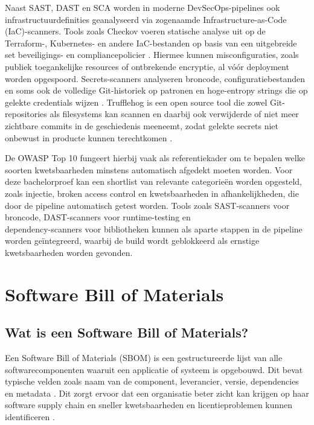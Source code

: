 Naast SAST, DAST en SCA worden in moderne DevSecOps-pipelines ook infrastructuurdefinities geanalyseerd via zogenaamde Infrastructure-as-Code (IaC)-scanners. Tools zoals Checkov voeren statische analyse uit op de Terraform-, Kubernetes- en andere IaC-bestanden op basis van een uitgebreide set beveiligings- en compliancepolicier \autocite{CheckovDoc,CheckovGithub}. Hiermee kunnen misconfiguraties, zoals publiek toegankelijke resources of ontbrekende encryptie, al vóór deployment worden opgespoord. Secrets-scanners analyseren broncode, configuratiebestanden en soms ook de volledige Git-historiek op patronen en hoge-entropy strings die op gelekte credentials wijzen \autocite{TrufflehogDeepDive}. Trufflehog is een open source tool die zowel Git-repositories als filesystems kan scannen en daarbij ook verwijderde of niet meer zichtbare commits in de geschiedenis meeneemt, zodat gelekte secrets niet onbewust in producte kunnen terechtkomen \autocite{TrufflehogGithub,TrufflehogBlogGitVsFs,TrufflehogBlogDeletedCommits}.

De OWASP Top 10 \autocite{OWASPTop10_2025} fungeert hierbij vaak als referentiekader om te bepalen welke soorten kwetsbaarheden minstens automatisch afgedekt moeten worden. Voor deze bachelorproef kan een shortlist van relevante categorieën worden opgesteld, zoals injectie, broken access control en kwetsbaarheden in afhankelijkheden, die door de pipeline automatisch getest worden. Tools zoals SAST-scanners voor broncode, DAST-scanners voor runtime-testing en\\dependency-scanners voor bibliotheken kunnen als aparte stappen in de pipeline worden geïntegreerd, waarbij de build wordt geblokkeerd als ernstige kwetsbaarheden worden gevonden.

\section{Software Bill of Materials}
\subsection{Wat is een Software Bill of Materials?}

Een Software Bill of Materials (SBOM) is een gestructureerde lijst van alle softwarecomponenten waaruit een applicatie of systeem is opgebouwd. Dit bevat typische velden zoals naam van de component, leverancier, versie, dependencies en metadata \autocite{IEEE2025}. Dit zorgt ervoor dat een organisatie beter zicht kan krijgen op haar software supply chain en sneller kwetsbaarheden en licentieproblemen kunnen identificeren \autocite{Stalnaker2024}.

